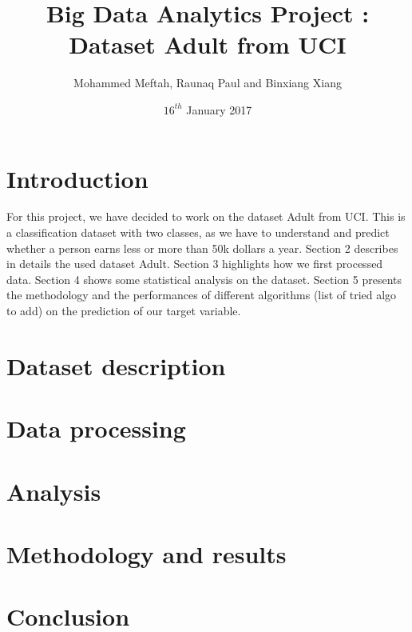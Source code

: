 \documentclass[12pt]{article}
\title{Big Data Analytics Project : Dataset Adult from UCI }
\author{Mohammed Meftah, Raunaq Paul and Binxiang Xiang}
\date{$16^{th}$ January 2017}
\begin{document}
\maketitle
\tableofcontents

\newpage
\section{Introduction}
For this project, we have decided to work on the dataset Adult from UCI. This is a classification dataset with two classes, as we have to understand and predict whether a person earns less or more than 50k dollars a year. Section 2 describes in details the used dataset Adult. Section 3 highlights how we first processed data. Section 4 shows some statistical analysis on the dataset. Section 5 presents the methodology and the performances of different algorithms (list of tried algo to add) on the prediction of our target variable. 

\section{Dataset description}
\section{Data processing}
\section{Analysis}
\section{Methodology and results}
\section{Conclusion}
\end{document}

